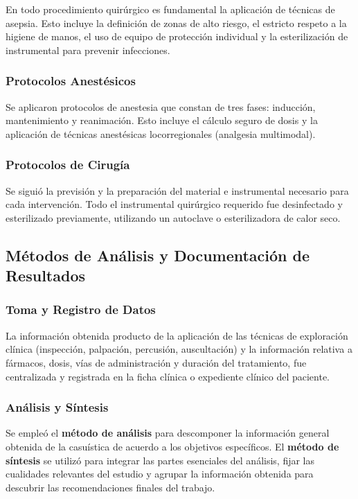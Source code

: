 	En todo procedimiento quirúrgico es fundamental la aplicación de técnicas de asepsia. Esto incluye la definición de zonas de alto riesgo, el estricto respeto a la higiene de manos, el uso de equipo de protección individual y la esterilización de instrumental para prevenir infecciones.

	\subsubsection{Protocolos Anestésicos}

	Se aplicaron protocolos de anestesia que constan de tres fases: inducción, mantenimiento y reanimación. Esto incluye el cálculo seguro de dosis y la aplicación de técnicas anestésicas locorregionales (analgesia multimodal).

	\subsubsection{Protocolos de Cirugía}

	Se siguió la previsión y la preparación del material e instrumental necesario para cada intervención. Todo el instrumental quirúrgico requerido fue desinfectado y esterilizado previamente, utilizando un autoclave o esterilizadora de calor seco.

	\subsection{Métodos de Análisis y Documentación de Resultados}

	\subsubsection{Toma y Registro de Datos}

	La información obtenida producto de la aplicación de las técnicas de exploración clínica (inspección, palpación, percusión, auscultación) y la información relativa a fármacos, dosis, vías de administración y duración del tratamiento, fue centralizada y registrada en la ficha clínica o expediente clínico del paciente.

	\subsubsection{Análisis y Síntesis}

	Se empleó el \textbf{método de análisis} para descomponer la información general obtenida de la casuística de acuerdo a los objetivos específicos. El \textbf{método de síntesis} se utilizó para integrar las partes esenciales del análisis, fijar las cualidades relevantes del estudio y agrupar la información obtenida para descubrir las recomendaciones finales del trabajo.

